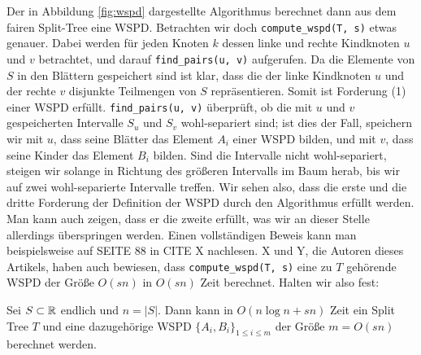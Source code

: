 	Der in Abbildung \ref{fig:wspd} dargestellte Algorithmus berechnet dann aus dem fairen Split-Tree eine WSPD.
	Betrachten wir doch \texttt{compute\_wspd(T, s)} etwas genauer. Dabei werden für jeden Knoten $k$ dessen linke und rechte Kindknoten $u$ und $v$ betrachtet, und darauf \texttt{find\_pairs(u, v)} aufgerufen. Da die Elemente von $S$ in den Blättern gespeichert sind ist klar, dass die der linke Kindknoten $u$ und der rechte $v$ disjunkte Teilmengen von $S$ repräsentieren. Somit ist Forderung (1) einer WSPD erfüllt. \texttt{find\_pairs(u, v)} überprüft, ob die mit $u$ und $v$ gespeicherten Intervalle $S_u$ und $S_v$ wohl-separiert sind; ist dies der Fall, speichern wir mit $u$, dass seine Blätter das Element $A_i$ einer WSPD bilden, und mit $v$, dass seine Kinder das Element $B_i$ bilden. Sind die Intervalle nicht wohl-separiert, steigen wir solange in Richtung des größeren Intervalls im Baum herab, bis wir auf zwei wohl-separierte Intervalle treffen. Wir sehen also, dass die erste und die dritte Forderung der Definition der WSPD durch den Algorithmus erfüllt werden. Man kann auch zeigen, dass er die zweite erfüllt, was wir an dieser Stelle allerdings überspringen werden. Einen vollständigen Beweis kann man beispielsweise auf SEITE 88 in CITE X nachlesen. X und Y, die Autoren dieses Artikels, haben auch bewiesen,
	dass \texttt{compute\_wspd(T, s)} eine zu $T$ gehörende WSPD der Größe $O(sn)$ in $O(sn)$ Zeit berechnet. Halten wir also fest:
	\begin{theorem}
		\label{theo:wspdtime}
		Sei $S \subset \mathbb{R}$ endlich und $n = |S|$. Dann kann in $O(n \log n + sn)$ Zeit ein Split Tree $T$ und eine dazugehörige WSPD $\{A_i, B_i\}_{1 \leq i \leq m}$ der Größe $m = O(sn)$ berechnet werden.
	\end{theorem}